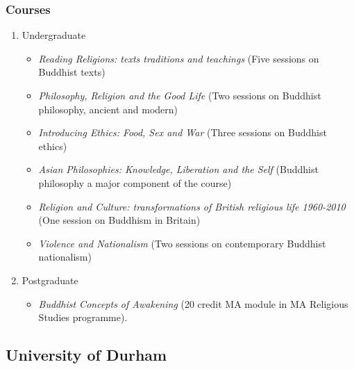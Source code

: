 \documentclass[a4paper,10.5pt]{article}
\begin{document}
\subsubsection{Courses}
\label{sec:org68357ad}
\begin{enumerate}
\item Undergraduate
\label{sec:org90726b6}
\begin{itemize}
\item \emph{Reading Religions: texts traditions and teachings} (Five sessions on Buddhist texts)\\
\item \emph{Philosophy, Religion and the Good Life} (Two sessions on Buddhist philosophy, ancient and modern)\\
\item \emph{Introducing Ethics: Food, Sex and War} (Three sessions on Buddhist ethics)\\
\item \emph{Asian Philosophies: Knowledge, Liberation and the Self} (Buddhist philosophy a major component of the course)\\
\item \emph{Religion and Culture: transformations of British religious life 1960-2010} (One session on Buddhism in Britain)\\
\item \emph{Violence and Nationalism} (Two sessions on contemporary Buddhist nationalism)\\
\end{itemize}
\item Postgraduate
\label{sec:org83d0b05}
\begin{itemize}
\item \emph{Buddhist Concepts of Awakening} (20 credit MA module in MA Religious Studies programme).\\
\end{itemize}
\end{enumerate}
\subsection{University of Durham}
\label{sec:org07bd7de}
\end{document}

